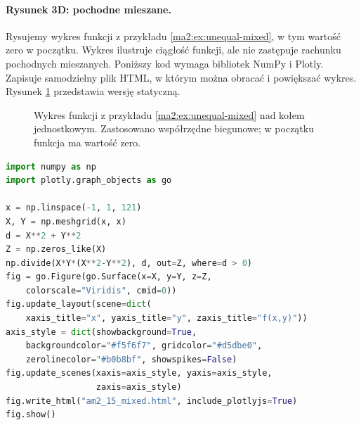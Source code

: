 \paragraph{Rysunek 3D: pochodne mieszane.}
Rysujemy wykres funkcji z przykładu
\ref{ma2:ex:unequal-mixed}, w tym wartość zero w początku.
Wykres ilustruje ciągłość funkcji, ale nie zastępuje
rachunku pochodnych mieszanych.
Poniższy kod wymaga bibliotek NumPy i Plotly. Zapisuje samodzielny
plik HTML, w którym można obracać i powiększać wykres.
Rysunek \ref{ma2:fig:unequal-mixed-surface} przedstawia wersję statyczną.

\begin{figure}[htbp]
\centering
{}
\caption{Wykres funkcji z przykładu \ref{ma2:ex:unequal-mixed} nad kołem jednostkowym. Zastosowano współrzędne biegunowe; w początku funkcja ma wartość zero.}
\label{ma2:fig:unequal-mixed-surface}
\end{figure}

\begin{lstlisting}[language=Python]
import numpy as np
import plotly.graph_objects as go

x = np.linspace(-1, 1, 121)
X, Y = np.meshgrid(x, x)
d = X**2 + Y**2
Z = np.zeros_like(X)
np.divide(X*Y*(X**2-Y**2), d, out=Z, where=d > 0)
fig = go.Figure(go.Surface(x=X, y=Y, z=Z,
    colorscale="Viridis", cmid=0))
fig.update_layout(scene=dict(
    xaxis_title="x", yaxis_title="y", zaxis_title="f(x,y)"))
axis_style = dict(showbackground=True,
    backgroundcolor="#f5f6f7", gridcolor="#d5dbe0",
    zerolinecolor="#b0b8bf", showspikes=False)
fig.update_scenes(xaxis=axis_style, yaxis=axis_style,
                  zaxis=axis_style)
fig.write_html("am2_15_mixed.html", include_plotlyjs=True)
fig.show()
\end{lstlisting}


